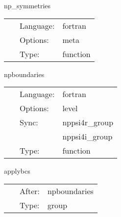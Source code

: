 
\hspace{5mm} np\_symmetries 

\hspace{5mm}{\it set symmetries for grid functions } 


\hspace{5mm}

 \begin{tabular*}{160mm}{cll} 
~ & Language:  & fortran \\ 
~ & Options:  & meta \\ 
~ & Type:  & function \\ 
\end{tabular*} 


\vspace{5mm}


\hspace{5mm} npboundaries 

\hspace{5mm}{\it symmetry boundary conditions } 


\hspace{5mm}

 \begin{tabular*}{160mm}{cll} 
~ & Language:  & fortran \\ 
~ & Options:  & level \\ 
~ & Sync:  & nppsi4r\_group \\ 
~& ~ &nppsi4i\_group\\ 
~ & Type:  & function \\ 
\end{tabular*} 


\vspace{5mm}


\hspace{5mm} applybcs 

\hspace{5mm}{\it apply boundary conditions } 


\hspace{5mm}

 \begin{tabular*}{160mm}{cll} 
~ & After:  & npboundaries \\ 
~ & Type:  & group \\ 
\end{tabular*} 


\vspace{5mm}


